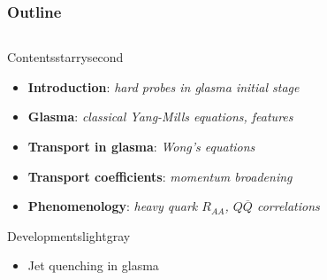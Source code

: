 \documentclass[aspectratio=169,11pt,usenames,dvipsnames]{beamer}
\begin{document}
\begin{frame}
    \frametitle{Outline}
    \vspace{-13pt}
    \begin{center}
        \begin{columns}
                \vspace{5pt}
                \begin{center}
                \begin{custombox2}{\large Contents}{starrysecond}
                    \footnotesize
                    \begin{varwidth}{0.89\textwidth}
                    \begin{itemize}\itemsep0em 
                        \item {\bfseries\color{starrysecond}Introduction}: {\scriptsize\itshape hard probes in glasma initial stage}
                        \item {\bfseries\color{starrysecond}Glasma}: {\scriptsize\itshape classical Yang-Mills equations, features}
                        \item {\bfseries\color{starrysecond}Transport in glasma}: {\scriptsize\itshape Wong's equations}
                        \item {\bfseries\color{starrysecond}Transport coefficients}: {\scriptsize\itshape momentum broadening}
                        \item {\bfseries\color{starrysecond}Phenomenology}: {\scriptsize\itshape heavy quark $R_{AA}$, $Q\overline{Q}$ correlations}
                    \end{itemize}
                    \end{varwidth}
                \end{custombox2}
                \vspace{15pt}
                \begin{custombox2}{{\color{jyured}\large Developments}}{lightgray}
                    \footnotesize
                    \begin{varwidth}{0.78\textwidth}
                    \begin{itemize}\itemsep0em 
                        \item Jet quenching in glasma

\end{itemize}
\end{varwidth}
\end{custombox2}
\end{center}
\end{columns}
\end{center}
\end{frame}
\end{document}
